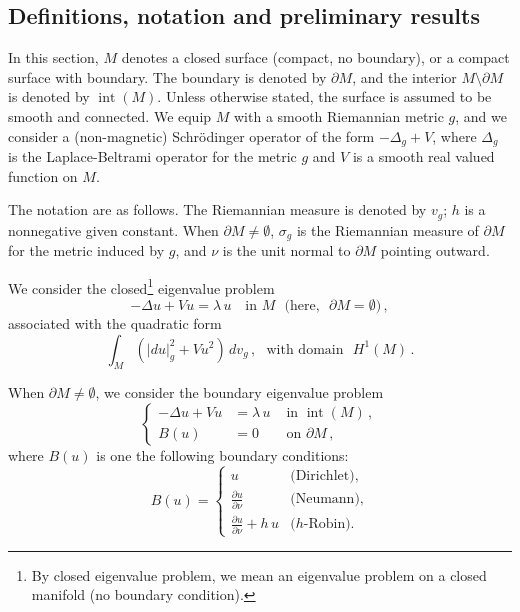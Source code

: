 \documentclass[12pt,a4paper]{amsart}
\theoremstyle{plain} %
\theoremstyle{definition}
\numberwithin{equation}{section}
\numberwithin{figure}{section}
\numberwithin{table}{section}
\DeclareMathOperator{\inte}{int}
\newcommand{\sm}{\!\setminus\!}
\begin{document}
\subsection{Definitions, notation and preliminary results}\label{SS-evp1}

In this section, $M$ denotes a closed surface (compact, no boundary), or a compact surface with boundary. The boundary is denoted by $\partial M$, and the interior $M\sm \partial M$ is denoted by $\inte(M)$. Unless otherwise stated, the surface is assumed to be smooth and connected. We equip $M$ with a smooth Riemannian metric $g$, and we consider a (non-magnetic) Schr\"{o}dinger operator of the form $-\Delta_g + V$, where $\Delta_g$ is the Laplace-Beltrami operator for the metric $g$ and $V$ is a smooth real valued function on $M$.\medskip

The notation are as follows. The Riemannian measure is denoted by $v_g$; $h$ is a nonnegative given constant. When $\partial M \not = \emptyset$, $\sigma_g$ is the Riemannian measure of $\partial M$ for the metric induced by $g$, and $\nu$ is the unit normal to $\partial M$ pointing outward.\smallskip

We consider the  closed\footnote{By closed eigenvalue problem, we mean an eigenvalue problem on a closed manifold (no boundary condition).} eigenvalue problem
%
\begin{equation}\label{E-evp-2c}
-\Delta u + V u = \lambda \, u \text{~~~in~} M \text{~~(here, ~}\partial M = \emptyset)\,,
\end{equation}
%
associated with the quadratic form
%
\begin{equation}\label{E-evp-2cq}
\int_M \left( |du|^2_g + V u^2 \right) \, dv_g\,, \text{~~with domain~~} H^1(M)\,.
\end{equation}

When $\partial M \not = \emptyset$, we consider the boundary eigenvalue problem
%
\begin{equation}\label{E-evp-2bc}
\left\{
\begin{array}{rll}
-\Delta u + V u & = \lambda \, u &\text{~in~} \inte(M)\,,\\[5pt]
B(u) &= 0 &\text{~on~} \partial M\,,
\end{array}
\right.
\end{equation}
%
where $B(u)$ is one the following boundary conditions:
%
\begin{equation}\label{E-evp-bc}
B(u) = \left\{
\begin{array}{ll}
u &\text{(Dirichlet),}\\[5pt]
\frac{\partial u}{\partial \nu} &\text{(Neumann),}\\[5pt]
\frac{\partial u}{\partial \nu}+h\,u &\text{($h$-Robin).}
\end{array}
\right.
\end{equation}
\end{document}
